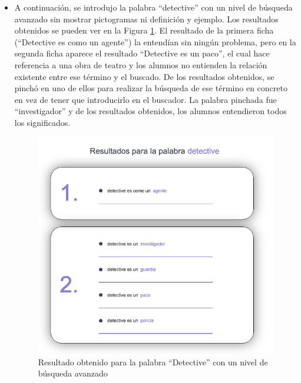 \begin{itemize}
	\item A continuación, se introdujo la palabra  ``detective'' con un nivel de búsqueda avanzado sin mostrar pictogramas ni definición y ejemplo. Los resultados obtenidos se pueden ver en la Figura \ref{fig:detectiveAvanzado}. El resultado de la primera ficha (``Detective es como un agente'') la entendían sin ningún problema, pero en la segunda ficha aparece el resultado ``Detective es un paco'', el cual hace referencia a una obra de teatro y los alumnos no entienden la relación existente entre ese término y el buscado.
	De los resultados obtenidos, se pinchó en uno de ellos para realizar la búsqueda de ese término en concreto en vez de tener que introducirlo en el buscador. La palabra pinchada fue ``investigador'' y de los resultados obtenidos, los alumnos entendieron todos los significados.
	\begin{figure}[!h]
		\includegraphics[width=.7\textwidth]{Imagenes/Bitmap/Capitulo4/EvaluacionFinal/4detectiveavanzado.png}
		\centering
		\caption{Resultado obtenido para la palabra ``Detective'' con un nivel de búsqueda avanzado}
		\label{fig:detectiveAvanzado}
	\end{figure}
	

\end{itemize}
